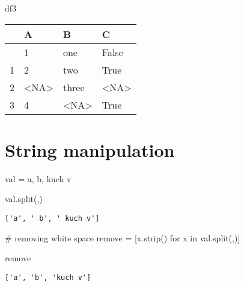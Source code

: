 \documentclass[
  letterpaper,
  DIV=11,
  numbers=noendperiod]{scrreprt}
\newenvironment{Shaded}{\begin{snugshade}}{\end{snugshade}}
\newcommand{\CommentTok}[1]{\textcolor[rgb]{0.37,0.37,0.37}{#1}}
\newcommand{\ControlFlowTok}[1]{\textcolor[rgb]{0.00,0.23,0.31}{#1}}
\newcommand{\KeywordTok}[1]{\textcolor[rgb]{0.00,0.23,0.31}{#1}}
\newcommand{\NormalTok}[1]{\textcolor[rgb]{0.00,0.23,0.31}{#1}}
\newcommand{\OperatorTok}[1]{\textcolor[rgb]{0.37,0.37,0.37}{#1}}
\newcommand{\StringTok}[1]{\textcolor[rgb]{0.13,0.47,0.30}{#1}}
\begin{document}
\begin{Shaded}
\begin{Highlighting}[]
\NormalTok{df3}
\end{Highlighting}
\end{Shaded}

\begin{longtable}[]{@{}llll@{}}
\toprule\noalign{}
& A & B & C \\
\midrule\noalign{}
\endhead
\bottomrule\noalign{}
\endlastfoot
0 & 1 & one & False \\
1 & 2 & two & True \\
2 & \textless NA\textgreater{} & three & \textless NA\textgreater{} \\
3 & 4 & \textless NA\textgreater{} & True \\
\end{longtable}

\hypertarget{string-manipulation-1}{%
\section{String manipulation}\label{string-manipulation-1}}

\begin{Shaded}
\begin{Highlighting}[]
\NormalTok{val }\OperatorTok{=} \StringTok{\textquotesingle{}a, b, kuch v\textquotesingle{}}

\NormalTok{val.split(}\StringTok{\textquotesingle{},\textquotesingle{}}\NormalTok{)}
\end{Highlighting}
\end{Shaded}

\begin{verbatim}
['a', ' b', ' kuch v']
\end{verbatim}

\begin{Shaded}
\begin{Highlighting}[]
\CommentTok{\# removing white space}
\NormalTok{remove }\OperatorTok{=}\NormalTok{ [x.strip() }\ControlFlowTok{for}\NormalTok{ x }\KeywordTok{in}\NormalTok{ val.split(}\StringTok{\textquotesingle{},\textquotesingle{}}\NormalTok{)]}


\NormalTok{remove}
\end{Highlighting}
\end{Shaded}

\begin{verbatim}
['a', 'b', 'kuch v']
\end{verbatim}
\end{document}
